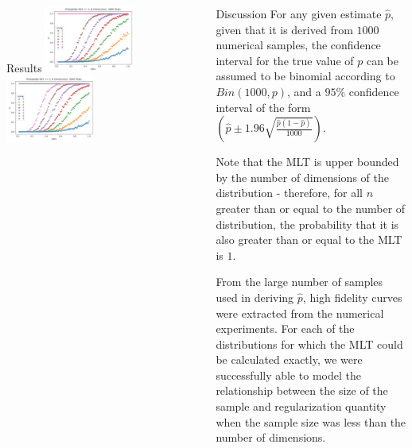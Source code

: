 \documentclass[final]{beamer}
\newlength{\sepwidth}
\newlength{\colwidth}
\newcommand{\separatorcolumn}{\begin{column}{\sepwidth}\end{column}}
\begin{document}
\begin{frame}[t]
\begin{columns}[t]
\begin{column}{\colwidth}
\begin{block}{Results}
\includegraphics[width = 0.5\textwidth]{figures/8dPlot.png}
\includegraphics[width = 0.5\textwidth]{figures/9dPlot.png}

  \end{block}



\end{column}

\separatorcolumn

\begin{column}{\colwidth}

  \begin{block}{Discussion}
    For any given estimate $\hat{p}$, given that it is derived from $1000$ numerical samples, the confidence interval for the true value of $p$ can be assumed to be binomial according to $Bin(1000, p)$, and a $95\%$ confidence interval of the form $(\hat{p} \pm 1.96\sqrt{\frac{\hat{p}(1-\hat{p})}{1000}})$.

    Note that the MLT is upper bounded by the number of dimensions of the distribution - therefore, for all $n$ greater than or equal to the number of distribution, the probability that it is also greater than or equal to the MLT is $1$.
    
    From the large number of samples used in deriving $\hat{p}$, high fidelity curves were extracted from the numerical experiments. For each of the distributions for which the MLT could be calculated exactly, we were successfully able to model the relationship between the size of the sample and regularization quantity when the sample size was less than the number of dimensions. 


\end{block}
\end{column}
\end{columns}
\end{frame}
\end{document}
